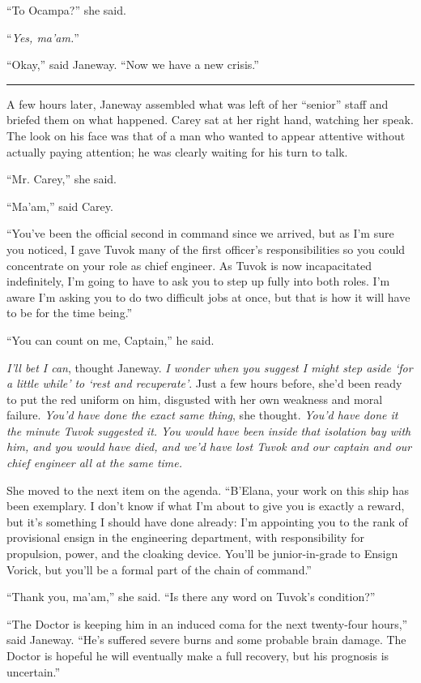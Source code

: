 \documentclass[twoside,letterpaper,12pt]{memoir}
\begin{document}
``To Ocampa?'' she said. 

``\textit{Yes, ma'am.}'' 

``Okay,'' said Janeway. ``Now we have a new crisis.'' 

\fancybreak{\rule{3cm}{0.4 pt}} 

A few hours later, Janeway assembled what was left of her ``senior'' staff and briefed them on what happened. Carey sat at her right hand, watching her speak. The look on his face was that of a man who wanted to appear attentive without actually paying attention; he was clearly waiting for his turn to talk. 

``Mr. Carey,'' she said. 

``Ma'am,'' said Carey. 

``You've been the official second in command since we arrived, but as I'm sure you noticed, I gave Tuvok many of the first officer's responsibilities so you could concentrate on your role as chief engineer. As Tuvok is now incapacitated indefinitely, I'm going to have to ask you to step up fully into both roles. I'm aware I'm asking you to do two difficult jobs at once, but that is how it will have to be for the time being.'' 

``You can count on me, Captain,'' he said. 

\textit{I'll bet I can}, thought Janeway. \textit{I wonder when you suggest I might step aside `for a little while' to `rest and recuperate'}. Just a few hours before, she'd been ready to put the red uniform on him, disgusted with her own weakness and moral failure. \textit{You'd have done the exact same thing}, she thought. \textit{You'd have done it the minute Tuvok suggested it. You would have been inside that isolation bay with him, and you would have died, and we'd have lost Tuvok and our captain and our chief engineer all at the same time. }

She moved to the next item on the agenda. ``B'Elana, your work on this ship has been exemplary. I don't know if what I'm about to give you is exactly a reward, but it's something I should have done already: I'm appointing you to the rank of provisional ensign in the engineering department, with responsibility for propulsion, power, and the cloaking device. You'll be junior-in-grade to Ensign Vorick, but you'll be a formal part of the chain of command.'' 

``Thank you, ma'am,'' she said. ``Is there any word on Tuvok's condition?'' 

``The Doctor is keeping him in an induced coma for the next twenty-four hours,'' said Janeway. ``He's suffered severe burns and some probable brain damage. The Doctor is hopeful he will eventually make a full recovery, but his prognosis is uncertain.'' 
\end{document}
